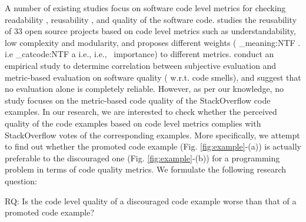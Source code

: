 \documentclass{sig-alternate}
\makeatletter
\newcommand\latinabbrev[1]{
  \peek_meaning:NTF . {%
    #1\@}%
  { \peek_catcode:NTF a {%
      #1., \@ }%
    {#1., \@}}}
\def\ie{\latinabbrev{i.e}}
\makeatother
\begin{document}
A number of existing studies focus on software code level metrics for checking readability \cite{readability}, reusability \cite{reusability}, and quality \cite{lochmann, survey} of the software code. \citet{reusability} studies the reusability of 33 open source projects based on code level metrics such as understandability, low complexity and modularity, and proposes different weights (\ie\ importance) to different metrics. \citet{subjective} conduct an empirical study to determine correlation between subjective evaluation and metric-based evaluation on software quality ( w.r.t. code smells), and suggest that no evaluation alone is completely reliable. However, as per our knowledge, no study focuses on the metric-based code quality of the StackOverflow code examples. In our research, we are interested to check whether the perceived quality of the code examples based on code level metrics complies with StackOverflow votes of the corresponding examples. More specifically, we attempt to find out whether the promoted code example (Fig. \ref{fig:example}-(a)) is actually preferable to the discouraged one (Fig. \ref{fig:example}-(b)) for a programming problem in terms of code quality metrics. We formulate the following research question:
\begin{framed}
RQ: Is the code level quality of a discouraged code example worse than that of a promoted code example?
\end{framed}
\end{document}
